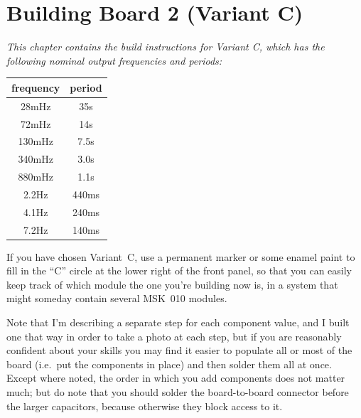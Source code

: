 
%
%
%
%
%
%

\chapter{Building Board 2 (Variant C)}

\emph{This chapter contains the build instructions for Variant C, which has
the following nominal output frequencies and periods:}

\begin{tabular}{cc}
frequency & period \\ \hline
28mHz & 35s \\
72mHz & 14s \\
130mHz & 7.5s \\
340mHz & 3.0s \\
880mHz & 1.1s \\
2.2Hz & 440ms \\
4.1Hz & 240ms \\
7.2Hz & 140ms
\end{tabular}

If you have chosen Variant~C, use a permanent marker or some enamel paint to
fill in the ``C'' circle at the lower right of the front panel, so that you
can easily keep track of which module the one you're building now is, in a
system that might someday contain several MSK~010 modules.

Note that I'm describing a separate step for each component value,
and I built one that way in order to take a photo at each step, but if you
are reasonably confident about your skills you may find it easier to
populate all or most of the board (i.e.\ put the components in place) and
then solder them all at once.  Except where noted, the order in which you
add components does not matter much; but do note that you should solder the
board-to-board connector before the larger capacitors, because otherwise
they block access to it.

